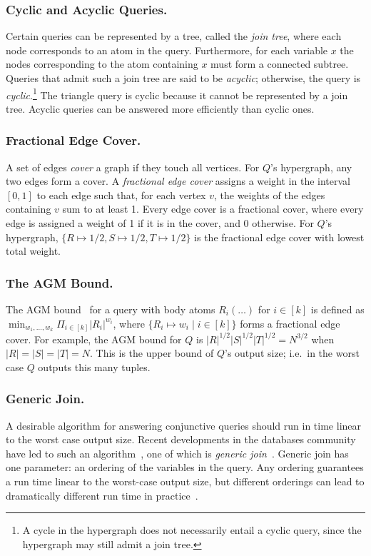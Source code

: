 \subsubsection*{Cyclic and Acyclic Queries.}
Certain queries can be represented by a tree,
 called the \textit{join tree},
 where each node corresponds to an atom in the query.
Furthermore, for each variable $x$ the nodes
 corresponding to the atom containing $x$
 must form a connected subtree.
Queries that admit such a join tree
 are said to be \textit{acyclic};
 otherwise, the query is \textit{cyclic}.\footnote{
  A cycle in the hypergraph does not necessarily entail a cyclic query,
   since the hypergraph may still admit a join tree.
}
The triangle query is cyclic because it cannot
 be represented by a join tree.
Acyclic queries can be answered more efficiently
 than cyclic ones.

\subsubsection*{Fractional Edge Cover.}
A set of edges \emph{cover} a graph if they touch all vertices. For $Q$'s
hypergraph, any two edges form a cover.
A \emph{fractional edge cover} assigns a
 weight in the interval $[0, 1]$ to each edge
 such that,
 for each vertex $v$,
 the weights of the edges containing $v$ sum to at least 1.
Every edge cover is a fractional cover,
 where every edge is assigned a weight of 1 if it is in the cover,
 and 0 otherwise.
For $Q$'s hypergraph,
 $\{R \mapsto 1/2, S \mapsto 1/2, T \mapsto 1/2\}$
 is the fractional edge cover with lowest total weight.

\subsubsection*{The AGM Bound.}
The AGM bound~\cite{agm} for a query with body atoms
 $R_{i}(\ldots)$ for $i \in [k]$
 is defined as $\min_{w_1,\ldots,w_k} \Pi_{i \in [k]} |R_{i}|^{w_i}$,
 where $\{R_{i} \mapsto w_{i} \mid i \in [k] \}$ forms a fractional edge cover.
For example, the AGM bound for $Q$ is
 $|R|^{1/2}|S|^{1/2}|T|^{1/2} = N^{3/2}$ when $|R| = |S| = |T| = N$.
This is the upper bound of $Q$’s output size;
 i.e.\ in the worst case $Q$ outputs this many tuples.

\subsubsection*{Generic Join.}

A desirable algorithm for answering conjunctive queries
 should run in time linear to the worst case output size.
Recent developments in the databases community have led to
 such an algorithm~\cite{wcoj}, one of which is \textit{generic join}~\cite{gj}.
Generic join has one parameter:
 an ordering of the variables in the query.
Any ordering guarantees a run time linear to the worst-case output size,
 but different orderings can lead to dramatically different run time
 in practice~\cite{emptyheaded}.

